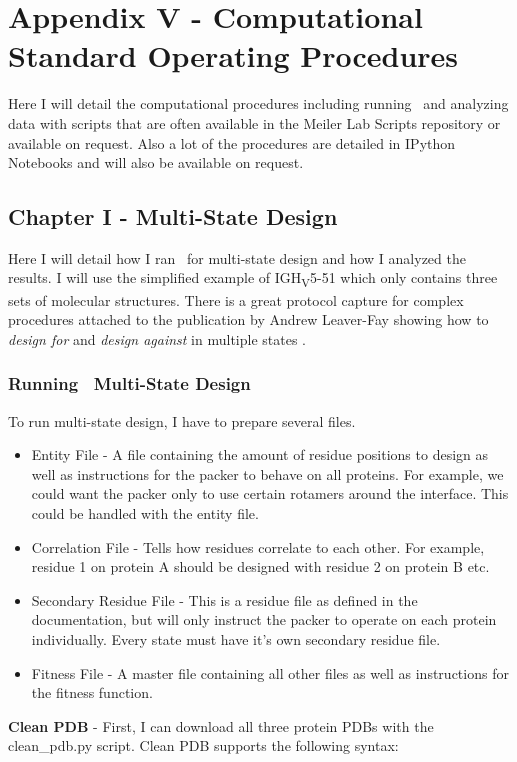 \section{Appendix V - Computational Standard Operating Procedures}
\label{sec:appenixV}
Here I will detail the computational procedures including running \rosetta~and analyzing data with scripts that are often available in the Meiler Lab Scripts repository or available on request. Also a lot of the procedures are detailed in IPython Notebooks and will also be available on request.
\subsection{Chapter I - Multi-State Design}
Here I will detail how I ran \rosettadesign~for multi-state design and how I analyzed the results. I will use the simplified example of IGH\textsubscript{V}5-51 which only contains three sets of molecular structures. There is a great protocol capture for complex procedures attached to the publication by Andrew Leaver-Fay showing how to \textit{design for} and \textit{design against} in multiple states \citep{LeaverFay:2011ji}.
\subsubsection{Running \rosetta~Multi-State Design}
To run multi-state design, I have to prepare several files.

\begin{itemize}
\item Entity File - A file containing the amount of residue positions to design as well as instructions for the packer to behave on all proteins. For example, we could want the packer only to use certain rotamers around the interface. This could be handled with the entity file.
\item Correlation File - Tells how residues correlate to each other. For example, residue 1 on protein A should be designed with residue 2 on protein B etc.
\item Secondary Residue File - This is a residue file as defined in the documentation, but will only instruct the packer to operate on each protein individually. Every state must have it's own secondary residue file.
\item Fitness File - A master file containing all other files as well as instructions for the fitness function.
\end{itemize}

\textbf{Clean PDB} - First, I can download all three protein PDBs with the clean\_pdb.py script. Clean PDB supports the following syntax:


